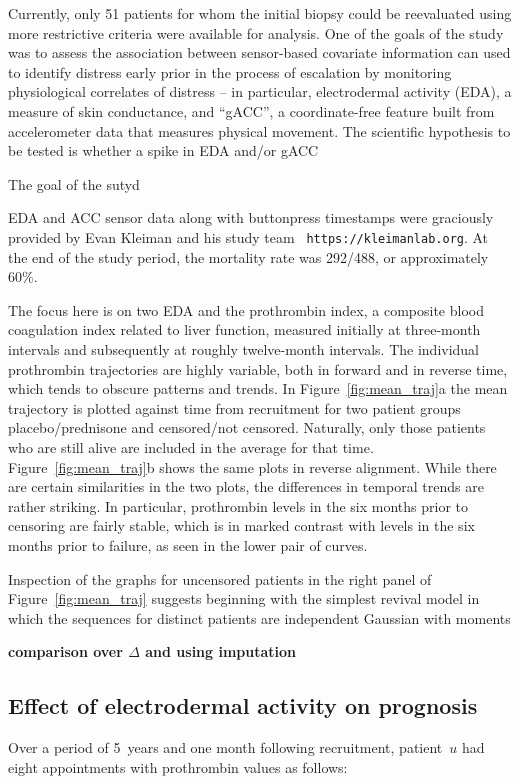 \documentclass[12pt]{amsart}
\begin{document}
Currently, only 51 patients for whom the initial biopsy could be
reevaluated using more restrictive criteria were available for
analysis.
One of the goals of the study was to assess the association between sensor-based covariate information can used to identify distress early prior in the process of escalation by monitoring physiological correlates of distress -- in particular, electrodermal activity (EDA), a measure of skin conductance, and ``gACC'', a coordinate-free feature built from accelerometer data that measures physical movement. The scientific hypothesis to be tested is whether a spike in EDA and/or gACC

The goal of the sutyd



EDA and ACC sensor data along with buttonpress timestamps were
graciously provided by Evan Kleiman and his study team {\tt
https://kleimanlab.org}.
At the end of the study period, the mortality rate was 292/488, or
approximately 60\%.

The focus here is on two EDA and the  prothrombin index, a composite
blood coagulation index
related to liver function, measured initially at three-month intervals
and subsequently at roughly twelve-month intervals.
The individual prothrombin trajectories are highly variable,
both in forward and in reverse time,
which tends to obscure patterns and trends.
In Figure~\ref{fig:mean_traj}a the mean trajectory is plotted against time from recruitment
for two patient groups placebo/prednisone and censored/not censored.
Naturally, only those patients who are still alive are included in the average
for that time.
Figure~\ref{fig:mean_traj}b shows the same plots in reverse alignment.
While there are certain similarities in the two plots,
the differences in temporal trends are rather striking.
In particular, prothrombin levels in the six months prior to censoring are fairly stable,
which is in marked contrast with levels in the six months prior to failure,
as seen in the lower pair of curves.

Inspection of the graphs for uncensored patients in the right panel of Figure~\ref{fig:mean_traj} suggests
beginning with the simplest revival model in which the sequences
for distinct patients are independent Gaussian with moments

{\bf comparison over $\Delta$ and using imputation}


\subsection{Effect of electrodermal activity on prognosis}
Over a period of 5~years and one month following recruitment,
patient~$u$ had eight appointments with prothrombin values as follows:
\end{document}
